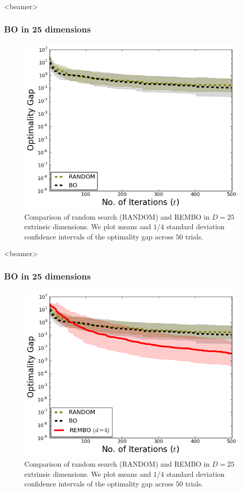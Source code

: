 \documentclass[grey]{beamer}
\begin{document}
 \begin{frame}<beamer>
 \frametitle{BO in 25 dimensions}
 \begin{figure}
   \includegraphics[width=0.6\columnwidth]{./figs/branin_dis2.png}
    \caption{Comparison of random search (RANDOM) and REMBO
     in $D=25$ extrinsic dimensions. 
     We plot means and $1/4$ standard deviation confidence intervals of the optimality gap across $50$ trials.}
   \label{fig:standard}
  \end{figure}
 \end{frame}
 
 
 \begin{frame}<beamer>
 \frametitle{BO in 25 dimensions}
 \begin{figure}
   \includegraphics[width=0.6\columnwidth]{./figs/branin_dis3.png}
    \caption{Comparison of random search (RANDOM) and REMBO
     in $D=25$ extrinsic dimensions. 
     We plot means and $1/4$ standard deviation confidence intervals of the optimality gap across $50$ trials.}
   \label{fig:standard}
  \end{figure}
 \end{frame}
 
\end{document}
